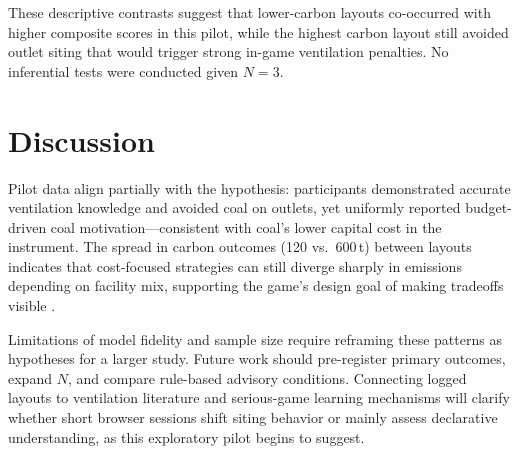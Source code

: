 \documentclass[stu, 12pt, apacite]{apa7}
\begin{document}
These descriptive contrasts suggest that lower-carbon layouts co-occurred with higher composite scores in this pilot, while the highest carbon layout still avoided outlet siting that would trigger strong in-game ventilation penalties. No inferential tests were conducted given $N = 3$.

\section{Discussion}

Pilot data align partially with the hypothesis: participants demonstrated accurate ventilation knowledge and avoided coal on outlets, yet uniformly reported budget-driven coal motivation---consistent with coal's lower capital cost in the instrument. The spread in carbon outcomes (120 vs.\ 600\,t) between layouts indicates that cost-focused strategies can still diverge sharply in emissions depending on facility mix, supporting the game's design goal of making tradeoffs visible \cite{iea2023stayingcool}.

Limitations of model fidelity and sample size require reframing these patterns as hypotheses for a larger study. Future work should pre-register primary outcomes, expand $N$, and compare rule-based advisory conditions. Connecting logged layouts to ventilation literature \cite{zheng2022urban,guan2015guiyang} and serious-game learning mechanisms \cite{seriousgame2019neighbourhood} will clarify whether short browser sessions shift siting behavior or mainly assess declarative understanding, as this exploratory pilot begins to suggest.


\end{document}
